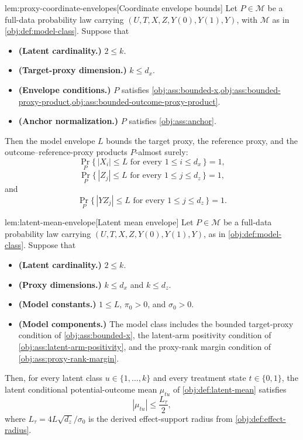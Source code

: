 \begin{lemmav}{lem:proxy-coordinate-envelopes}[Coordinate envelope bounds]
Let \(P\in\mathcal M\) be a full-data probability law carrying \((U,T,X,Z,Y(0),Y(1),Y)\), with \(\mathcal M\) as in \cref{obj:def:model-class}.  Suppose that
\begin{itemize}
\item \textbf{(Latent cardinality.)} \(2\le k\).
\item \textbf{(Target-proxy dimension.)} \(k\le d_x\).
\item \textbf{(Envelope conditions.)} \(P\) satisfies \cref{obj:ass:bounded-x,obj:ass:bounded-proxy-product,obj:ass:bounded-outcome-proxy-product}.
\item \textbf{(Anchor normalization.)} \(P\) satisfies \cref{obj:ass:anchor}.
\end{itemize}
Then the model envelope \(L\) bounds the target proxy, the reference proxy, and the outcome--reference-proxy products \(P\)-almost surely:
\[
\Pr_P\{\,|X_i|\le L\text{ for every }1\le i\le d_x\,\}=1,
\]
\[
\Pr_P\{\,|Z_j|\le L\text{ for every }1\le j\le d_z\,\}=1,
\]
and
\[
\Pr_P\{\,|Y Z_j|\le L\text{ for every }1\le j\le d_z\,\}=1.
\]
\end{lemmav}

\begin{lemmav}{lem:latent-mean-envelope}[Latent mean envelope]
Let \(P\in\mathcal M\) be a full-data probability law carrying \((U,T,X,Z,Y(0),Y(1),Y)\), as in \cref{obj:def:model-class}.  Suppose that
\begin{itemize}
\item \textbf{(Latent cardinality.)} \(2\le k\).
\item \textbf{(Proxy dimensions.)} \(k\le d_x\) and \(k\le d_z\).
\item \textbf{(Model constants.)} \(1\le L\), \(\pi_0>0\), and \(\sigma_0>0\).
\item \textbf{(Model components.)} The model class includes the bounded target-proxy condition of \cref{obj:ass:bounded-x}, the latent-arm positivity condition of \cref{obj:ass:latent-arm-positivity}, and the proxy-rank margin condition of \cref{obj:ass:proxy-rank-margin}.
\end{itemize}
Then, for every latent class \(u\in\{1,\ldots,k\}\) and every treatment state \(t\in\{0,1\}\), the latent conditional potential-outcome mean \(\mu_{tu}\) of \cref{obj:def:latent-mean} satisfies
\[
|\mu_{tu}|\le \frac{L_\tau}{2},
\]
where \(L_\tau=4L\sqrt{d_z}/\sigma_0\) is the derived effect-support radius from \cref{obj:def:effect-radius}.
\end{lemmav}

